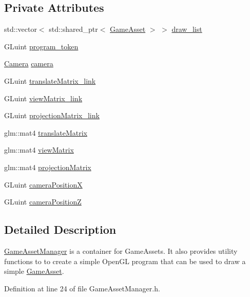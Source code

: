 \subsection*{Private Attributes}
\begin{DoxyCompactItemize}
\item 
std\+::vector$<$ std\+::shared\+\_\+ptr$<$ \hyperlink{class_game_asset}{Game\+Asset} $>$ $>$ \hyperlink{class_game_asset_manager_a671cddd92f1de4186c582fe0c4297b7d}{draw\+\_\+list}
\item 
G\+Luint \hyperlink{class_game_asset_manager_ad7bab17862e06ca692289f934b40548b}{program\+\_\+token}
\item 
\hyperlink{class_camera}{Camera} \hyperlink{class_game_asset_manager_af408912d75b4d97d29babc8850ecb8ae}{camera}
\item 
G\+Luint \hyperlink{class_game_asset_manager_a5e737710573e276ca53c683bc6731a51}{translate\+Matrix\+\_\+link}
\item 
G\+Luint \hyperlink{class_game_asset_manager_a71322a65c085d1d296e87aaddc4aea15}{view\+Matrix\+\_\+link}
\item 
G\+Luint \hyperlink{class_game_asset_manager_aa98eb0fb89a0a39e29be33294b322855}{projection\+Matrix\+\_\+link}
\item 
glm\+::mat4 \hyperlink{class_game_asset_manager_a1f0530749ec3ca5ee7925b2b70e8a8c2}{translate\+Matrix}
\item 
glm\+::mat4 \hyperlink{class_game_asset_manager_a4e702908c5d7d66e40c676d2c4f7930c}{view\+Matrix}
\item 
glm\+::mat4 \hyperlink{class_game_asset_manager_a2bc76e9ac72dcf9490436a59dc3bc752}{projection\+Matrix}
\item 
G\+Luint \hyperlink{class_game_asset_manager_a011295db68f0413a94700c5aa2778c45}{camera\+Position\+X}
\item 
G\+Luint \hyperlink{class_game_asset_manager_a076d00cef5f59a5038e168a0cc80420d}{camera\+Position\+Z}
\end{DoxyCompactItemize}


\subsection{Detailed Description}
\hyperlink{class_game_asset_manager}{Game\+Asset\+Manager} is a container for Game\+Assets. It also provides utility functions to to create a simple Open\+G\+L program that can be used to draw a simple \hyperlink{class_game_asset}{Game\+Asset}. 

Definition at line 24 of file Game\+Asset\+Manager.\+h.




